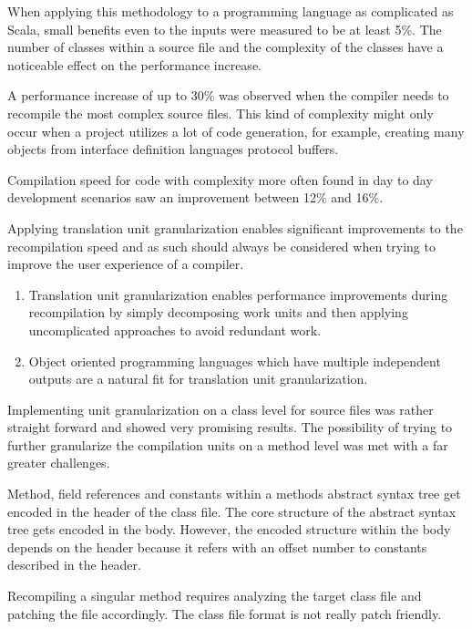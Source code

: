 \documentclass{VUMIFPSbakalaurinis}
\begin{document}
When applying this methodology to a programming language as complicated as Scala, small benefits even to the inputs were measured to be at least 5\%.
The number of classes within a source file and the complexity of the classes have a noticeable effect on the performance increase.

A performance increase of up to 30\% was observed when the compiler needs to recompile the most complex source files.
This kind of complexity might only occur when a project utilizes a lot of code generation, for example, creating many objects from interface definition languages protocol buffers.

Compilation speed for code with complexity more often found in day to day development scenarios saw an improvement between 12\% and 16\%.

Applying translation unit granularization enables significant improvements to the recompilation speed and as such should always be considered when trying to improve the user experience of a compiler.
\fi


\begin{enumerate}
\item{
	Translation unit granularization enables performance improvements during recompilation by simply decomposing work units and then applying uncomplicated approaches to avoid redundant work.
}
\item{
  Object oriented programming languages which have multiple independent outputs are a natural fit for translation unit granularization.
}
\end{enumerate}

\iffalse
{}

Implementing unit granularization on a class level for source files was rather straight forward and showed very promising results.
The possibility of trying to further granularize the compilation units on a method level was met with a far greater challenges.

Method, field references and constants within a methods abstract syntax tree get encoded in the header of the class file.
The core structure of the abstract syntax tree gets encoded in the body.
However, the encoded structure within the body depends on the header because it refers with an offset number to constants described in the header.

Recompiling a singular method requires analyzing the target class file and patching the file accordingly.
The class file format is not really patch friendly.
\end{document}

